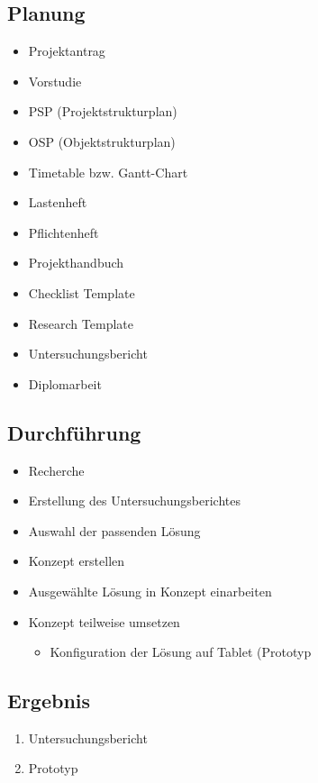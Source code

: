 \subsection{Planung}
\begin{itemize}
	\item Projektantrag
	\item Vorstudie
	\item PSP (Projektstrukturplan)
	\item OSP (Objektstrukturplan)
	\item Timetable bzw. Gantt-Chart
	\item Lastenheft
	\item Pflichtenheft
	\item Projekthandbuch
	\item Checklist Template
	\item Research Template
	\item Untersuchungsbericht
	\item Diplomarbeit
\end{itemize}
\subsection{Durchführung}
\begin{itemize}
	\item Recherche
	\item Erstellung des Untersuchungsberichtes
	\item Auswahl der passenden Lösung
	\item Konzept erstellen
	\item Ausgewählte Lösung in Konzept einarbeiten
	\item Konzept teilweise umsetzen
	\begin{itemize}
		\item Konfiguration der Lösung auf Tablet (Prototyp
	\end{itemize}
\end{itemize}
\subsection{Ergebnis}
\begin{enumerate}
	\item Untersuchungsbericht
	\item Prototyp
\end{enumerate}

